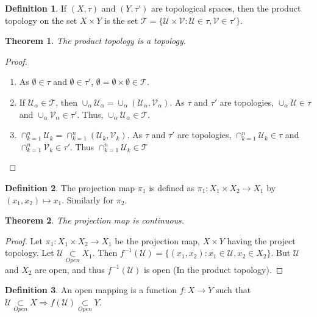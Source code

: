 \documentclass[oneside]{book}
\newtheorem{theorem}{Theorem}[section]
\theoremstyle{definition}
\newtheorem{definition}{Definition}[section]
\begin{document}
\begin{definition}
If $(X,\tau)$ and $(Y,\tau')$ are topological spaces, then the product topology on the set $X\times Y$ is the set $\mathscr{T} = \{\mathcal{U}\times \mathcal{V}:\mathcal{U}\in\tau,\mathcal{V}\in \tau'\}$.
\end{definition}

\begin{theorem}
The product topology is a topology.
\end{theorem}
\begin{proof}
\
\begin{enumerate}
\item As $\emptyset \in \tau$ and $\emptyset\in \tau'$, $\emptyset =\emptyset\times \emptyset \in \mathscr{T}$.
\item If $\mathscr{U}_{\alpha}\in \mathscr{T}$, then $\cup_{\alpha} \mathscr{U}_{\alpha} = \cup_{\alpha} (\mathcal{U}_{\alpha},\mathcal{V}_{\alpha})$. As $\tau$ and $\tau'$ are topologies, $\cup_{\alpha} \mathcal{U} \in \tau$ and $\cup_{\alpha}\mathcal{V}_{\alpha} \in \tau'$. Thus, $\cup_{\alpha}\mathscr{U}_{\alpha} \in \mathscr{T}$.
\item $\cap_{k=1}^{n} \mathscr{U}_{k} = \cap_{k=1}^{n} (\mathcal{U}_k,\mathcal{V}_k)$. As $\tau$ and $\tau'$ are topologies, $\cap_{k=1}^{n}\mathcal{U}_k \in \tau$ and $\cap_{k=1}^{n}\mathcal{V}_{k} \in \tau'$. Thus $\cap_{k=1}^{n} \mathscr{U}_k \in \mathscr{T}$
\end{enumerate}
\end{proof}

\begin{definition}
The projection map $\pi_1$ is defined as $\pi_1:X_1\times X_2\rightarrow X_1$ by $(x_1,x_2)\mapsto x_1$. Similarly for $\pi_2$.
\end{definition}

\begin{theorem}
The projection map is continuous.
\end{theorem}
\begin{proof}
Let $\pi_1:X_1\times X_2\rightarrow X_1$ be the projection map, $X\times Y$ having the project topology. Let $\mathcal{U}\underset{Open}\subset X_1$. Then $f^{-1}(\mathcal{U}) = \{(x_1,x_2):x_1\in \mathcal{U}, x_2\in X_2\}$. But $\mathcal{U}$ and $X_2$ are open, and thus $f^{-1}(\mathcal{U})$ is open (In the product topology).
\end{proof}

\begin{definition}
An open mapping is a function $f:X\rightarrow Y$ such that $\mathcal{U}\underset{Open}\subset X\Rightarrow f(\mathcal{U}) \underset{Open}\subset Y$.
\end{definition}
\end{document}
